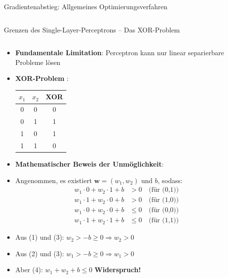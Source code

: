 \documentclass[aspectratio=1610, xcolor=dvipsnames, 9pt]{beamer}
\begin{document}
\begin{frame}{Gradientenabstieg: Allgemeines Optimierungsverfahren}
\begin{columns}
\begin{column}{0.3\textwidth}
          \end{column}
        \end{columns}
      \end{frame}

\begin{frame}{Grenzen des Single-Layer-Perceptrons -- Das XOR-Problem}
  \begin{columns}
    \begin{column}{0.6\textwidth}
      \begin{itemize}
        \item \textbf{Fundamentale Limitation}: Perceptron kann nur linear separierbare Probleme lösen
        \item \textbf{XOR-Problem} \cite{minsky1969}: 
        \begin{center}
        \begin{tabular}{|c|c|c|}
        \hline
        $x_1$ & $x_2$ & XOR \\
        \hline
        0 & 0 & 0 \\
        0 & 1 & 1 \\
        1 & 0 & 1 \\
        1 & 1 & 0 \\
        \hline
        \end{tabular}
        \end{center}
        \item \textbf{Mathematischer Beweis der Unmöglichkeit}: 
        \item Angenommen, es existiert $\mathbf{w} = (w_1, w_2)$ und $b$, sodass:
        \begin{align}
          w_1 \cdot 0 + w_2 \cdot 1 + b &> 0 \quad \text{(für (0,1))} \\
          w_1 \cdot 1 + w_2 \cdot 0 + b &> 0 \quad \text{(für (1,0))} \\
          w_1 \cdot 0 + w_2 \cdot 0 + b &\leq 0 \quad \text{(für (0,0))} \\
          w_1 \cdot 1 + w_2 \cdot 1 + b &\leq 0 \quad \text{(für (1,1))}
        \end{align}
        \item Aus (1) und (3): $w_2 > -b \geq 0 \Rightarrow w_2 > 0$
        \item Aus (2) und (3): $w_1 > -b \geq 0 \Rightarrow w_1 > 0$
        \item Aber (4): $w_1 + w_2 + b \leq 0$ \textbf{Widerspruch!}
      \end{itemize}
    \end{column}
    \begin{column}{0.4\textwidth}

\end{column}
\end{columns}
\end{frame}
\end{document}
